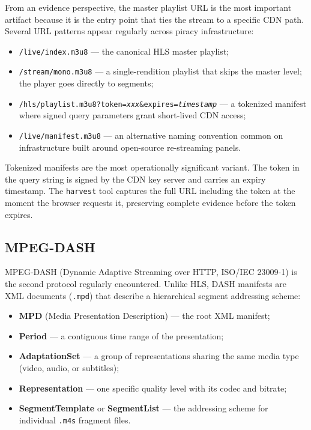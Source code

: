 From an evidence perspective, the master playlist URL is the most important artifact because
it is the entry point that ties the stream to a specific CDN path. Several URL patterns
appear regularly across piracy infrastructure:

\begin{itemize}
  \item \texttt{/live/index.m3u8} — the canonical HLS master playlist;
  \item \texttt{/stream/mono.m3u8} — a single-rendition playlist that skips the master
    level; the player goes directly to segments;
  \item \texttt{/hls/playlist.m3u8?token=\textit{xxx}\&expires=\textit{timestamp}} —
    a tokenized manifest where signed query parameters grant short-lived CDN access;
  \item \texttt{/live/manifest.m3u8} — an alternative naming convention common on
    infrastructure built around open-source re-streaming panels.
\end{itemize}

Tokenized manifests are the most operationally significant variant. The token in the query
string is signed by the CDN key server and carries an expiry timestamp. The \texttt{harvest}
tool captures the full URL including the token at the moment the browser requests it,
preserving complete evidence before the token expires.

\subsection{MPEG-DASH}

MPEG-DASH (Dynamic Adaptive Streaming over HTTP, ISO/IEC 23009-1) is the second protocol
regularly encountered. Unlike HLS, DASH manifests are XML documents (\texttt{.mpd}) that
describe a hierarchical segment addressing scheme:

\begin{itemize}
  \item \textbf{MPD} (Media Presentation Description) — the root XML manifest;
  \item \textbf{Period} — a contiguous time range of the presentation;
  \item \textbf{AdaptationSet} — a group of representations sharing the same media type
    (video, audio, or subtitles);
  \item \textbf{Representation} — one specific quality level with its codec and bitrate;
  \item \textbf{SegmentTemplate} or \textbf{SegmentList} — the addressing scheme for
    individual \texttt{.m4s} fragment files.
\end{itemize}


